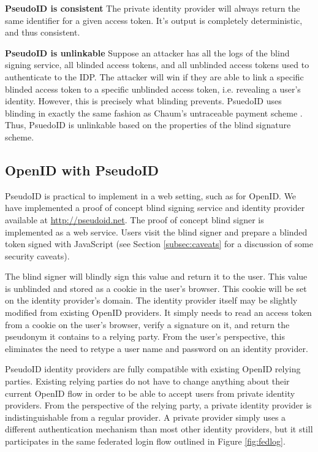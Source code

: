 \documentclass{llncs}
\begin{document}
\begin{claim}[2]\textbf{PseudoID is consistent}
  The private identity provider will always return the same identifier
  for a given access token. It's output is completely deterministic,
  and thus consistent.
\end{claim}

\begin{claim}[2]\textbf{PseudoID is unlinkable}
  Suppose an attacker has all the logs of the blind signing service,
  all blinded access tokens, and all unblinded access tokens used to
  authenticate to the IDP. The attacker will win if they are able to
  link a specific blinded access token to a specific unblinded access
  token, i.e. revealing a user's identity. However, this is precisely
  what blinding prevents. PsuedoID uses blinding in exactly the same
  fashion as Chaum's untraceable payment scheme \cite{Cha82}. Thus,
  PsuedoID is unlinkable based on the properties of the blind
  signature scheme.
\end{claim}

\subsection{OpenID with PseudoID}

PseudoID is practical to implement in a web setting, such as for
OpenID. We have implemented a proof of concept blind signing service
and identity provider available at \url{http://pseudoid.net}. The
proof of concept blind signer is implemented as a web service. Users
visit the blind signer and prepare a blinded token signed with
JavaScript (see Section \ref{subsec:caveats} for a discussion of some
security caveats).

The blind signer will blindly sign this value and return it to the
user. This value is unblinded and stored as a cookie in the user's
browser. This cookie will be set on the identity provider's
domain. The identity provider itself may be slightly modified from
existing OpenID providers. It simply needs to read an access token
from a cookie on the user's browser, verify a signature on it, and
return the pseudonym it contains to a relying party. From the user's
perspective, this eliminates the need to retype a user name and
password on an identity provider.

PseudoID identity providers are fully compatible with existing OpenID
relying parties. Existing relying parties do not have to change
anything about their current OpenID flow in order to be able to accept
users from private identity providers. From the perspective of the
relying party, a private identity provider is indistinguishable from a
regular provider. A private provider simply uses a different
authentication mechanism than most other identity providers, but it
still participates in the same federated login flow outlined in Figure
\ref{fig:fedlog}.
\end{document}
